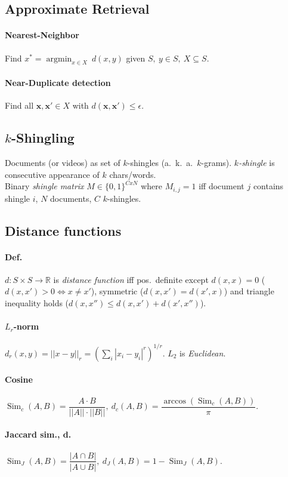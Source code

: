 \documentclass[9pt]{scrartcl}
\DeclareMathOperator{\argmin}{argmin}
\DeclareMathOperator{\Sim}{Sim}
\newcommand{\eps}{\epsilon}
\newcommand{\R}{\mathbb{R}}
\begin{document}
\begin{twocolumn}

\section{Approximate Retrieval}
\paragraph{Nearest-Neighbor} Find $x^* = \argmin_{x \in X} \ d(x,y)$
given $S,\ y \in S,\ X\subseteq S$.
\paragraph{Near-Duplicate detection}
Find all $\bm x, \bm x'\in X$ with $d(\bm x,\bm x') \leq \eps$.
\subsection{$k$-Shingling}
Documents (or videos) as set of $k$-shingles (a.\ k.\ a.\ $k$-grams).
\emph{$k$-shingle} is consecutive appearance of $k$ chars/words. \\
Binary \emph{shingle matrix} $M \in \{0,1\}^{CxN}$ where $M_{i,j} = 1$ iff document $j$ contains shingle $i$, $N$ documents, $C$ $k$-shingles.
\subsection{Distance functions}
\paragraph{Def.}
$d: S \times S \rightarrow \R$ is \emph{distance function} iff pos.\ definite except $d(x,x) = 0$ ($d(x,x') > 0 \iff x \neq x'$), symmetric ($d(x,x') = d(x',x)$) and triangle inequality holds ($d(x,x'') \leq d(x,x') + d(x',x'')$).
\paragraph{$L_r$-norm}
$d_r(x,y) = ||x-y||_r = (\sum_i |x_i - y_i|^r)^{1/r}$. $L_2$ is \emph{Euclidean}.
\paragraph{Cosine}
$\Sim_c(A,B) = \dfrac{A \cdot B}{||A||\cdot||B||},\ d_c(A,B) = \dfrac{\arccos(\Sim_c(A,B))}{\pi}.$
\paragraph{Jaccard sim., d.}
$\Sim_J(A,B) = \dfrac{|A \cap B|}{|A \cup B|},\ d_J(A,B) = 1 - \Sim_J(A,B).$


\end{twocolumn}
\end{document}
